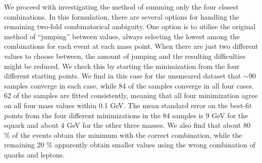\documentclass[twoside,english]{uiofysmaster}
\begin{document}
We proceed with investigating the method of summing only the four closest combinations. In this formulation, there are several options for handling the remaining two-fold combinatorical ambiguity. One option is to utilise the original method of ``jumping'' between values, always selecting the lowest among the combinations for each event at each mass point. When there are just two different values to choose between, the amount of jumping and the resulting difficulties might be reduced. We check this by starting the minimization from the four different starting points. We find in this case for the unsmeared dataset that $\sim 90$ samples converge in each case, while 84 of the samples converge in all four cases. 62 of the samples are fitted consistently, meaning that all four minimization agree on all four mass values within 0.1 GeV. The mean standard error on the best-fit points from the four different minimizations in the 84 samples is 9 GeV for the squark and about 4 GeV for the other three masses. We also find that about 80 \% of the events obtain the minimum with the correct combination, while the remaining 20 \% apparently obtain smaller values using the wrong combination of quarks and leptons.
\end{document}
